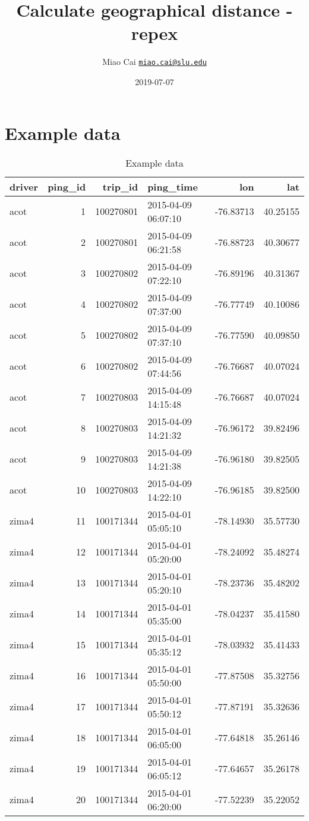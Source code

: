 \documentclass[]{article}
\title{Calculate geographical distance - repex}
\author{Miao Cai \href{mailto:miao.cai@slu.edu}{\nolinkurl{miao.cai@slu.edu}}}
\date{2019-07-07}
\begin{document}
\maketitle

{
\setcounter{tocdepth}{2}
\tableofcontents
}
\hypertarget{example-data}{%
\section*{Example data}\label{example-data}}

\begin{table}[!h]

\caption{\label{tab:unnamed-chunk-2}Example data}
\centering
\begin{tabular}{lrrlrr}
\toprule
driver & ping\_id & trip\_id & ping\_time & lon & lat\\
\midrule
acot & 1 & 100270801 & 2015-04-09 06:07:10 & -76.83713 & 40.25155\\
acot & 2 & 100270801 & 2015-04-09 06:21:58 & -76.88723 & 40.30677\\
acot & 3 & 100270802 & 2015-04-09 07:22:10 & -76.89196 & 40.31367\\
acot & 4 & 100270802 & 2015-04-09 07:37:00 & -76.77749 & 40.10086\\
acot & 5 & 100270802 & 2015-04-09 07:37:10 & -76.77590 & 40.09850\\
\addlinespace
acot & 6 & 100270802 & 2015-04-09 07:44:56 & -76.76687 & 40.07024\\
acot & 7 & 100270803 & 2015-04-09 14:15:48 & -76.76687 & 40.07024\\
acot & 8 & 100270803 & 2015-04-09 14:21:32 & -76.96172 & 39.82496\\
acot & 9 & 100270803 & 2015-04-09 14:21:38 & -76.96180 & 39.82505\\
acot & 10 & 100270803 & 2015-04-09 14:22:10 & -76.96185 & 39.82500\\
\addlinespace
zima4 & 11 & 100171344 & 2015-04-01 05:05:10 & -78.14930 & 35.57730\\
zima4 & 12 & 100171344 & 2015-04-01 05:20:00 & -78.24092 & 35.48274\\
zima4 & 13 & 100171344 & 2015-04-01 05:20:10 & -78.23736 & 35.48202\\
zima4 & 14 & 100171344 & 2015-04-01 05:35:00 & -78.04237 & 35.41580\\
zima4 & 15 & 100171344 & 2015-04-01 05:35:12 & -78.03932 & 35.41433\\
\addlinespace
zima4 & 16 & 100171344 & 2015-04-01 05:50:00 & -77.87508 & 35.32756\\
zima4 & 17 & 100171344 & 2015-04-01 05:50:12 & -77.87191 & 35.32636\\
zima4 & 18 & 100171344 & 2015-04-01 06:05:00 & -77.64818 & 35.26146\\
zima4 & 19 & 100171344 & 2015-04-01 06:05:12 & -77.64657 & 35.26178\\
zima4 & 20 & 100171344 & 2015-04-01 06:20:00 & -77.52239 & 35.22052\\
\bottomrule
\end{tabular}
\end{table}
\end{document}
